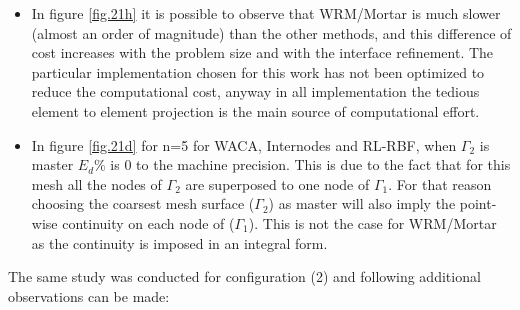 \begin{itemize}
     \item In figure \ref{fig.21h} it is possible to observe that WRM/Mortar is much slower (almost an order of magnitude) than the other methods, and this difference of cost increases with the problem size and with the interface refinement. The particular implementation chosen for this work has not been optimized to reduce the computational cost, anyway in all implementation the tedious element to element projection is the main source of computational effort.
     \item In figure \ref{fig.21d} for n=5 for WACA, Internodes and RL-RBF, when $\Gamma_2$ is master  $E_d \%$ is 0 to the machine precision. This is due to the fact that for this mesh all the nodes of $\Gamma_2$ are superposed to one node of $\Gamma_1$. For that reason choosing the coarsest mesh surface ($\Gamma_2$) as master will also imply the  point-wise continuity on each node of ($\Gamma_1$). This is not the case for WRM/Mortar as the continuity is imposed in an integral form.
 \end{itemize}
 The same study was conducted for configuration (2) and following additional observations can be made:
